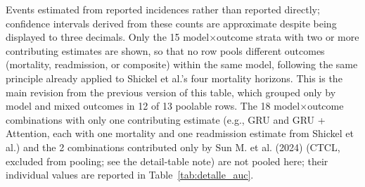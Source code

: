 \begin{table}[H]
\par\vspace{0.4em}\footnotesize * Events estimated from reported incidences rather than reported directly; confidence intervals derived from these counts are approximate despite being displayed to three decimals. Only the 15 model$\times$outcome strata with two or more contributing estimates are shown, so that no row pools different outcomes (mortality, readmission, or composite) within the same model, following the same principle already applied to Shickel et al.'s four mortality horizons. This is the main revision from the previous version of this table, which grouped only by model and mixed outcomes in 12 of 13 poolable rows. The 18 model$\times$outcome combinations with only one contributing estimate (e.g., GRU and GRU + Attention, each with one mortality and one readmission estimate from Shickel et al.) and the 2 combinations contributed only by Sun M. et al. (2024) (CTCL, excluded from pooling; see the detail-table note) are not pooled here; their individual values are reported in Table~\ref{tab:detalle_auc}.
\end{table}
